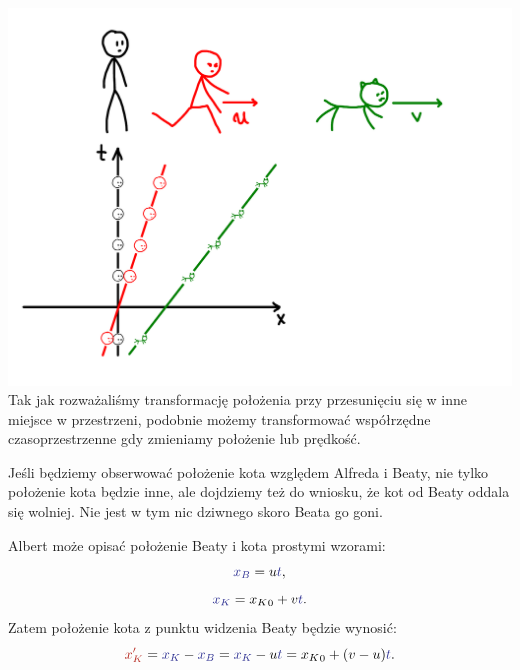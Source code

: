 \documentclass[10pt,twocolumn,fleqn,polish]{article}
\providecommand{\mathcolor}[2]{{\color{#1}#2}}
\begin{document}
\noindent\includegraphics[width=1\linewidth]{pages/STA-page5}
Tak jak rozważaliśmy transformację położenia przy przesunięciu
się w inne miejsce w przestrzeni, podobnie możemy transformować
współrzędne czasoprzestrzenne gdy zmieniamy położenie lub prędkość.

Jeśli będziemy obserwować położenie kota względem Alfreda i Beaty,
nie tylko położenie kota będzie inne, ale dojdziemy też do wniosku,
że kot od Beaty oddala się wolniej.
Nie jest w tym nic dziwnego skoro Beata go goni.

Albert może opisać położenie Beaty i kota prostymi wzorami:
\[ \mathcolor{Blue}{x_B} = u\mathcolor{Blue}{t}, \]
\[ \mathcolor{Blue}{x_K} = {x_K}_0 + v\mathcolor{Blue}{t}. \]
Zatem położenie kota z punktu widzenia Beaty będzie wynosić:
\[
  \mathcolor{BrickRed}{x_K'}
  = \mathcolor{Blue}{x_K} - \mathcolor{Blue}{x_B}
  = {\color{Blue}x_K} - u\mathcolor{Blue}{t}
    = {x_K}_0 + (v-u)\mathcolor{Blue}{t}.
\]
\newpage
\end{document}
